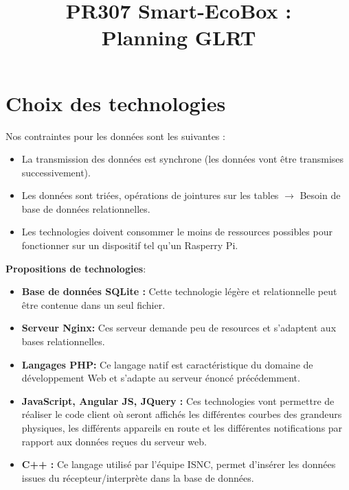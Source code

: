 \documentclass[10pt,a4paper]{article}
\title{PR307 Smart-EcoBox : \\ Planning GLRT}
\begin{document}
\maketitle
\section{Choix des technologies}
Nos contraintes pour les données sont les suivantes :
\begin{itemize}
\item La transmission des données est synchrone (les données vont être transmises successivement).
\item Les données sont triées, opérations de jointures sur les tables $\rightarrow$ Besoin de base de données relationnelles.
\item Les technologies doivent consommer le moins de ressources possibles pour fonctionner sur un dispositif tel qu'un Rasperry Pi.\\
\end{itemize}   
\textbf{Propositions de technologies}:\\
\begin{itemize}
\item \textbf{Base de données SQLite : }Cette technologie légère et relationnelle peut être contenue dans un seul fichier.\\ 
\item \textbf{Serveur Nginx: }Ces serveur demande peu de resources et s'adaptent aux bases relationnelles.\\
\item \textbf{Langages PHP: }Ce langage natif est caractéristique du domaine de développement Web et s'adapte au serveur énoncé précédemment.\\
\item \textbf{JavaScript, Angular JS, JQuery : } Ces technologies vont permettre de réaliser le code client où seront affichés les différentes courbes des grandeurs physiques, les différents appareils en route et les différentes notifications par rapport aux données reçues du serveur web.\\
\item \textbf{C++ :} Ce langage utilisé par l'équipe ISNC, permet d'insérer les données issues du récepteur/interprète dans la base de données.

\end{itemize}
\end{document}
